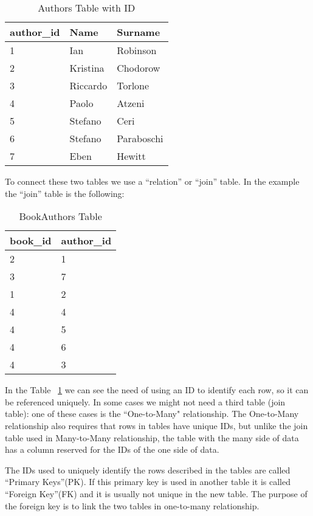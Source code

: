 \documentclass[a4page, 11pt]{article}
\begin{document}
\begin{table}[h]
	\centering
	\begin{tabular}{|l|l|l|}
		\hline
		
		\textbf{author\_id} & \textbf{Name} & \textbf{Surname}\\ 
		\hline
		1 & Ian & Robinson\\
		\hline
		2 & Kristina & Chodorow\\ 
		\hline
		3 & Riccardo & Torlone\\
		\hline
		4 & Paolo & Atzeni\\
		\hline
		5 & Stefano & Ceri\\
		\hline
		6 & Stefano & Paraboschi\\
		\hline
		7 & Eben & Hewitt\\
		\hline
		
	\end{tabular}
	\caption{Authors Table with ID}
\end{table}

To connect these two tables we use a ``relation'' or ``join'' table. In the example the ``join'' table is the following:
\pagebreak
\begin{table}[h]
	\centering
	\begin{tabular}{|l|l|}
		\hline
		
		\textbf{book\_id} & \textbf{author\_id} \\
		\hline
		2 & 1\\
		\hline
		3 & 7\\
		\hline
		1 & 2\\
		\hline
		4 & 4\\
		\hline
		4 & 5\\
		\hline
		4 & 6\\
		\hline
		4 & 3\\
		\hline
	\end{tabular}
	\caption{BookAuthors Table}
	\label{table:join}
\end{table}

In the Table ~\ref{table:join} we can see the need of using an ID to identify each row, so it can be referenced uniquely. 
In some cases we might not need a third table (join table): one of these cases is the ``One-to-Many" relationship. 
The One-to-Many relationship also requires that rows in tables have unique IDs, but unlike the join table used in Many-to-Many relationship, the table with the many side of data has a column reserved for the IDs of the one side of data.

The IDs used to uniquely identify the rows described in the tables are called ``Primary Keys''(PK). 
If this primary key is used in another table it is called ``Foreign Key''(FK) and it is usually not unique in the new table. The purpose of the foreign key is to link the two tables in one-to-many relationship.
\end{document}
